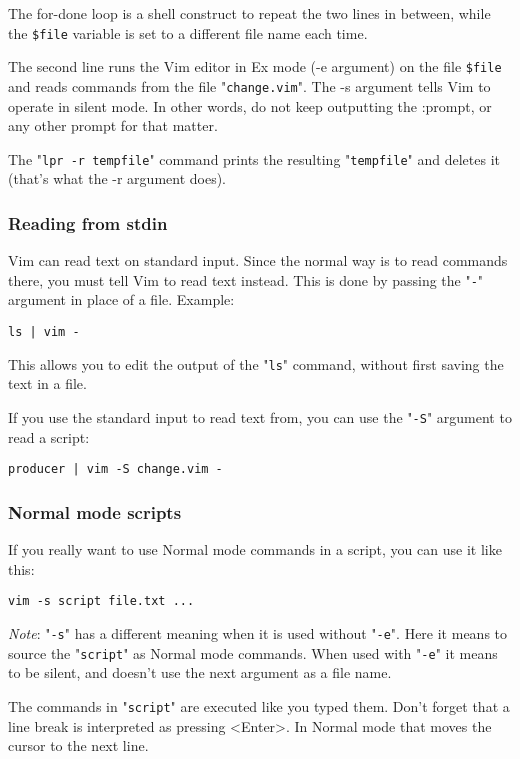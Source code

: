 {The for-done loop is a shell construct to repeat the two lines in between, while the \texttt{\$file} variable is set to a different file name each time.

The second line runs the Vim editor in Ex mode (-e argument) on the file \texttt{\$file} and reads commands from the file "\texttt{change.vim}".
The -s argument tells Vim to operate in silent mode.
In other words, do not keep outputting the :prompt, or any other prompt for that matter.

The "\texttt{lpr -r tempfile}" command prints the resulting "\texttt{tempfile}" and deletes it (that's what the -r argument does).
\subsubsection{Reading from stdin}
Vim can read text on standard input.
Since the normal way is to read commands there, you must tell Vim to read text instead.
This is done by passing the "\texttt{-}" argument in place of a file.
Example:

\begin{Verbatim}[samepage=true]
 ls | vim -
\end{Verbatim}

This allows you to edit the output of the "\texttt{ls}" command, without first saving the text in a file.

If you use the standard input to read text from, you can use the "\texttt{-S}" argument to read a script:

\begin{Verbatim}[samepage=true]
 producer | vim -S change.vim -
\end{Verbatim}

\subsubsection{Normal mode scripts}
If you really want to use Normal mode commands in a script, you can use it like this:

\begin{Verbatim}[samepage=true]
 vim -s script file.txt ...
\end{Verbatim}
 
\emph{Note}: "\texttt{-s}" has a different meaning when it is used without "\texttt{-e}".
Here it means to source the "\texttt{script}" as Normal mode commands.
When used with "\texttt{-e}" it means to be silent, and doesn't use the next argument as a file name.

The commands in "\texttt{script}" are executed like you typed them.
Don't forget that a line break is interpreted as pressing <Enter>.
In Normal mode that moves the cursor to the next line.

}
